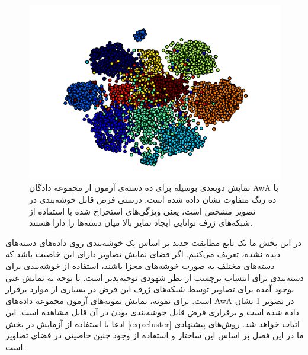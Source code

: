 \begin{figure}[!t]
\centering
\includegraphics[width=0.85\linewidth]{images/awa_clusters}
\caption[نمایش دسته‌های آزمون مجموعه دادگان AwA ]{
نمایش دوبعدی بوسیله  برای ده دسته‌ی آزمون از مجموعه دادگان AwA با ده رنگ متفاوت نشان داده شده است. درستی فرض قابل خوشه‌بندی در تصویر مشخص است، یعنی ویژگی‌های استخراج شده با استفاده از شبکه‌های ژرف توانایی ایجاد تمایز بالا میان دسته‌ها را دارا هستند.
}
\label{fig:awa_clusters}
\end{figure}

در این بخش ما یک تابع مطابقت جدید بر اساس یک خوشه‌بندی روی داده‌های دسته‌های دیده نشده، تعریف می‌کنیم. اگر فضای نمایش تصاویر دارای این خاصیت باشد که دسته‌های مختلف به صورت خوشه‌های مجزا باشند، استفاده از خوشه‌بندی برای دسته‌بندی برای انتساب برچسب از نظر شهودی توجیه‌پذیر است.
با توجه به نمایش غنی بوجود آمده برای تصاویر توسط شبکه‌های ژرف این فرض در بسیاری از موارد برقرار است. برای نمونه، نمایش  نمونه‌های آزمون مجموعه داده‌های AwA در تصویر
\ref{fig:awa_clusters}
نشان داده شده است و برقراری فرض قابل خوشه‌بندی بودن در آن قابل مشاهده است. این ادعا با استفاده از آزمایش در بخش
\ref{exp:cluster}
اثبات خواهد شد. روش‌های پیشنهادی ما در این فصل بر اساس این ساختار و استفاده از وجود چنین خاصیتی در فضای تصاویر است.

